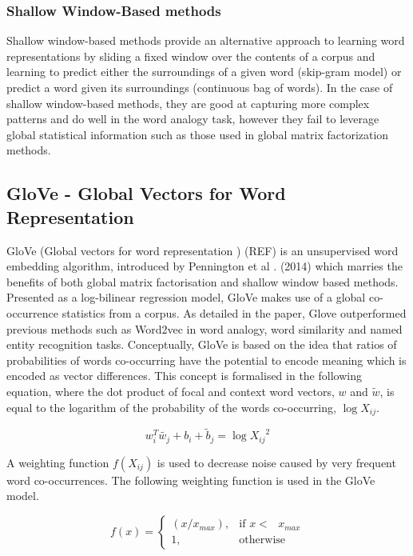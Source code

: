 \subsubsection{Shallow Window-Based methods}
Shallow window-based methods provide an alternative approach to learning word representations by sliding a fixed window over the contents of a corpus and learning to predict either the surroundings of a given word (skip-gram model) or predict a word given its surroundings (continuous bag of words). In the case of shallow window-based methods, they are good at capturing more complex patterns and do well in the word analogy task, however they fail to leverage global statistical information such as those used in global matrix factorization methods.
\subsection{GloVe - Global Vectors for Word Representation}
GloVe (Global vectors for word representation ) (REF) is an unsupervised word embedding algorithm, introduced by Pennington et al . (2014) which marries the benefits of both global matrix factorisation and shallow window based methods. Presented as a log-bilinear regression model, GloVe makes use of a global co-occurrence statistics from a corpus. As detailed in the paper, Glove outperformed previous methods such as Word2vec in word analogy, word similarity and named entity recognition tasks. Conceptually, GloVe is based on the idea that ratios of probabilities of words co-occurring have the potential to encode meaning which is encoded as vector differences. This concept is formalised in the following equation, where the dot product of focal and context word vectors, \(w\) and \(\tilde{w}\), is equal to the logarithm of the probability of the words co-occurring, \(\log{X_{ij}}\).

\begin{equation}
w_{i}^{T} \tilde{w_{j}} + b_{i} + \tilde{b}_{j} = \log{X_{ij}}^{2}
\end{equation}

\noindent
\newline
A weighting function \(f(X_{ij})\) is used to decrease noise caused by very frequent word co-occurrences. The following weighting function is used in the GloVe model.

\begin{equation}
	f(x) =
	\begin{cases}
	(x/x_{max}), & \text{if  \(x <\) } x_{max} \\
	1, & \text{otherwise}
	\end{cases}
\end{equation}

